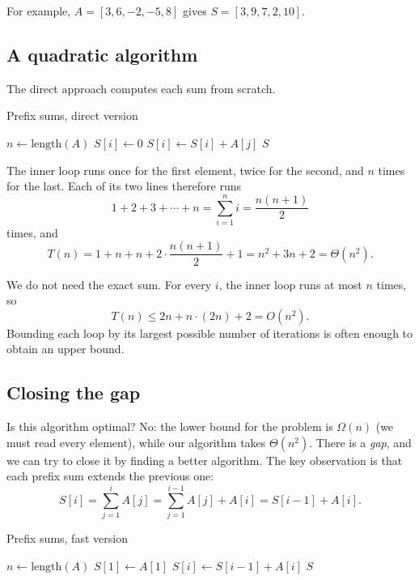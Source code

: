 \documentclass[a4paper,12pt,oneside]{report}
\begin{document}
For example, $A=[3,6,-2,-5,8]$ gives $S=[3,9,7,2,10]$.

\subsection{A quadratic algorithm}

The direct approach computes each sum from scratch.

\begin{framedalgo}{Prefix sums, direct version}\label{alg:prefix-slow}
\begin{algorithmic}[1]
  \State $n\gets\mathrm{length}(A)$ 
   
    \State $S[i]\gets0$ 
     
      \State $S[i]\gets S[i]+A[j]$ 
    \EndFor
  \EndFor
  \State \Return $S$ 
\end{algorithmic}
\end{framedalgo}

The inner loop runs once for the first element, twice for the second,
and $n$ times for the last. Each of its two lines therefore runs
\[
  1+2+3+\cdots+n=\sum_{i=1}^{n}i=\frac{n(n+1)}{2}
\]
times, and
\[
  T(n)=1+n+n+2\cdot\frac{n(n+1)}{2}+1=n^2+3n+2=\Theta(n^2).
\]

\begin{notebox}
We do not need the exact sum. For every $i$, the inner loop runs at
most $n$ times, so
\[
  T(n)\leq 2n+n\cdot(2n)+2=O(n^2).
\]
Bounding each loop by its largest possible number of iterations is
often enough to obtain an upper bound.
\end{notebox}

\subsection{Closing the gap}

Is this algorithm optimal? No: the lower bound for the problem is
$\Omega(n)$ (we must read every element), while our algorithm takes
$\Theta(n^2)$. There is a \emph{gap}, and we can try to close it by
finding a better algorithm. The key observation is that each prefix
sum extends the previous one:
\[
  S[i]=\sum_{j=1}^{i}A[j]=\sum_{j=1}^{i-1}A[j]+A[i]=S[i-1]+A[i].
\]

\begin{framedalgo}{Prefix sums, fast version}\label{alg:prefix-fast}
\begin{algorithmic}[1]
  \State $n\gets\mathrm{length}(A)$
  \State $S[1]\gets A[1]$
    \State $S[i]\gets S[i-1]+A[i]$ 
  \EndFor
  \State \Return $S$
\end{algorithmic}
\end{framedalgo}
\end{document}
